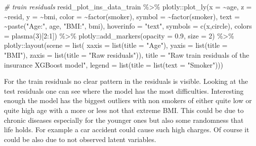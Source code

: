 \documentclass[
]{book}
\newenvironment{Shaded}{\begin{snugshade}}{\end{snugshade}}
\newcommand{\AttributeTok}[1]{\textcolor[rgb]{0.77,0.63,0.00}{#1}}
\newcommand{\CommentTok}[1]{\textcolor[rgb]{0.56,0.35,0.01}{\textit{#1}}}
\newcommand{\DecValTok}[1]{\textcolor[rgb]{0.00,0.00,0.81}{#1}}
\newcommand{\FloatTok}[1]{\textcolor[rgb]{0.00,0.00,0.81}{#1}}
\newcommand{\FunctionTok}[1]{\textcolor[rgb]{0.00,0.00,0.00}{#1}}
\newcommand{\NormalTok}[1]{#1}
\newcommand{\SpecialCharTok}[1]{\textcolor[rgb]{0.00,0.00,0.00}{#1}}
\newcommand{\StringTok}[1]{\textcolor[rgb]{0.31,0.60,0.02}{#1}}
\begin{document}
\begin{Shaded}
\begin{Highlighting}[]
\CommentTok{\# train residuals}
\NormalTok{resid\_plot\_ins\_data\_train }\SpecialCharTok{\%\textgreater{}\%}
\NormalTok{  plotly}\SpecialCharTok{::}\FunctionTok{plot\_ly}\NormalTok{(}\AttributeTok{x =} \SpecialCharTok{\textasciitilde{}}\NormalTok{age, }\AttributeTok{z =} \SpecialCharTok{\textasciitilde{}}\NormalTok{resid, }\AttributeTok{y =} \SpecialCharTok{\textasciitilde{}}\NormalTok{bmi,}
                  \AttributeTok{color =} \SpecialCharTok{\textasciitilde{}}\FunctionTok{factor}\NormalTok{(smoker),}
                  \AttributeTok{symbol =} \SpecialCharTok{\textasciitilde{}}\FunctionTok{factor}\NormalTok{(smoker),}
                  \AttributeTok{text =} \SpecialCharTok{\textasciitilde{}}\FunctionTok{paste}\NormalTok{(}\StringTok{"Age:"}\NormalTok{, age, }\StringTok{"BMI:"}\NormalTok{, bmi),}
                  \AttributeTok{hoverinfo =} \StringTok{"text"}\NormalTok{,}
                  \AttributeTok{symbols =} \FunctionTok{c}\NormalTok{(}\StringTok{\textquotesingle{}x\textquotesingle{}}\NormalTok{,}\StringTok{\textquotesingle{}circle\textquotesingle{}}\NormalTok{),}
                  \AttributeTok{colors =} \FunctionTok{plasma}\NormalTok{(}\DecValTok{3}\NormalTok{)[}\DecValTok{2}\SpecialCharTok{:}\DecValTok{1}\NormalTok{]) }\SpecialCharTok{\%\textgreater{}\%}
\NormalTok{  plotly}\SpecialCharTok{::}\FunctionTok{add\_markers}\NormalTok{(}\AttributeTok{opacity =} \FloatTok{0.9}\NormalTok{,}
                      \AttributeTok{size =} \DecValTok{2}\NormalTok{) }\SpecialCharTok{\%\textgreater{}\%}
\NormalTok{  plotly}\SpecialCharTok{::}\FunctionTok{layout}\NormalTok{(}\AttributeTok{scene =} \FunctionTok{list}\NormalTok{(}
    \AttributeTok{xaxis =} \FunctionTok{list}\NormalTok{(}\AttributeTok{title =} \StringTok{"Age"}\NormalTok{),}
    \AttributeTok{yaxis =} \FunctionTok{list}\NormalTok{(}\AttributeTok{title =} \StringTok{"BMI"}\NormalTok{),}
    \AttributeTok{zaxis =} \FunctionTok{list}\NormalTok{(}\AttributeTok{title =} \StringTok{"Raw residuals"}\NormalTok{)),}
    \AttributeTok{title =} \StringTok{"Raw train residuals of the insurance XGBoost model"}\NormalTok{,}
    \AttributeTok{legend =} \FunctionTok{list}\NormalTok{(}\AttributeTok{title =} \FunctionTok{list}\NormalTok{(}\AttributeTok{text =} \StringTok{"Smoker"}\NormalTok{)))}
\end{Highlighting}
\end{Shaded}

For the train residuals no clear pattern in the residuals is visible. Looking at the test residuals one can see where the model has the most difficulties. Interesting enough the model has the biggest outliers with non smokers of either quite low or quite high age with a more or less not that extreme BMI. This could be due to chronic diseases especially for the younger ones but also some randomness that life holds. For example a car accident could cause such high charges. Of course it could be also due to not observed latent variables.
\end{document}
